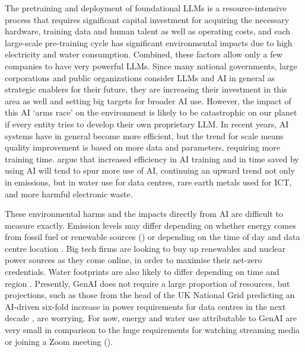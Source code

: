 \documentclass[output=paper]{langscibook}
\begin{document}
The pretraining and deployment of foundational LLMs is a resource-intensive process that requires significant capital investment for acquiring the necessary hardware, training data and human talent as well as operating costs, and each large-scale pre-training cycle has significant environmental impacts due to high electricity and water consumption. Combined, these factors allow only a few companies to have very powerful LLMs. Since many national governments, large corporations and public organizations consider LLMs and AI in general as strategic enablers for their future, they are increasing their investment in this area as well and setting big targets for broader AI use. However, the impact of this AI ‘arms race’ on the environment is likely to be catastrophic on our planet if every entity tries to develop their own proprietary LLM. In recent years, AI systems have in general become more efficient, but the trend for scale means quality improvement is based on more data and parameters, requiring more training time. \citet{luccioni_efficiency_2025} argue that increased efficiency in AI training and in time saved by using AI will tend to spur more use of AI, continuing an upward trend not only in emissions, but in water use for data centres, rare earth metals used for ICT, and more harmful electronic waste.

These environmental harms and the impacts directly from AI are difficult to measure exactly. Emission levels may differ depending on whether energy comes from fossil fuel or renewable sources (\citealt{shterionov2022ecologicalfootprint}) or depending on the time of day and data centre location \citep{dodgeetal2022}. Big tech firms are looking to buy up renewables and nuclear power sources as they come online, in order to maximise their net-zero credentials. Water footprints are also likely to differ depending on time and region \citep{li_making_2025}. Presently, GenAI does not require a large proportion of resources, but projections, such as those from the head of the UK National Grid predicting an AI-driven six-fold increase in power requirements for data centres in the next decade \citep{bbc_data_2024}, are worrying. For now, energy and water use attributable to GenAI are very small in comparison to the huge requirements for watching streaming media or joining a Zoom meeting (\citealt{mytton_network_2024}). 
\end{document}
